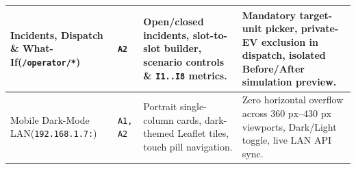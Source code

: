 \begin{table}[H]
\begin{tabularx}{\textwidth}{|L{3.9cm}|C{1.5cm}|L{4.1cm}|Y|}
    \hline
    Incidents, Dispatch \& What-If\newline(\texttt{/operator/*}) & \texttt{A2} & Open/closed incidents, slot-to-slot builder, scenario controls \& \texttt{I1..I8} metrics. & Mandatory target-unit picker, private-EV exclusion in dispatch, isolated Before/After simulation preview. \\
    \hline
    Mobile Dark-Mode LAN\newline(\texttt{192.168.1.7:}) & \texttt{A1, A2} & Portrait single-column cards, dark-themed Leaflet tiles, touch pill navigation. & Zero horizontal overflow across $360\text{ px}$--$430\text{ px}$ viewports, Dark/Light toggle, live LAN API sync. \\
    \hline
  \end{tabularx}
\end{table}
